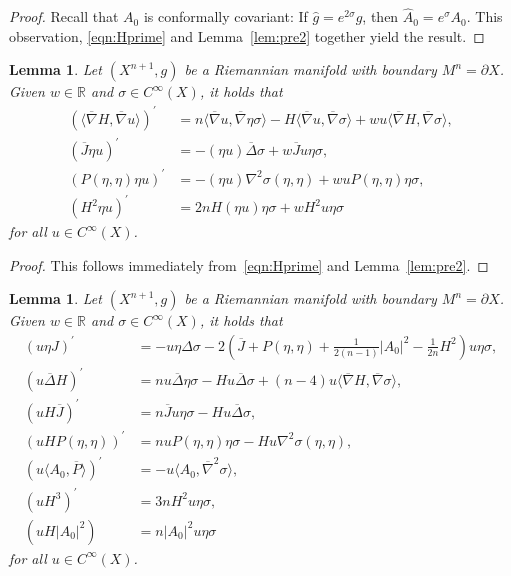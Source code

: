 \documentclass{amsart}
\newtheorem{lem}[thm]{Lemma}
\theoremstyle{definition}
\theoremstyle{remark}
\numberwithin{equation}{section}
\begin{document}
\begin{proof}
 Recall that $A_0$ is conformally covariant: If ${\widehat{g}}=e^{2\sigma}g$, then ${\widehat{A}}_0=e^{\sigma}A_0$.  This observation, \eqref{eqn:Hprime} and Lemma~\ref{lem:pre2} together yield the result.
\end{proof}

\begin{lem}
 \label{lem:pre31}
 Let $(X^{n+1},g)$ be a Riemannian manifold with boundary $M^n=\partial X$.  Given $w\in{\mathbb{R}}$ and $\sigma\in C^\infty(X)$, it holds that
 \begin{align*}
  \left({\langle}{\overline{\nabla}} H,{\overline{\nabla}} u{\rangle}\right)^\prime & = n{\langle}{\overline{\nabla}} u,{\overline{\nabla}}\eta\sigma{\rangle} - H{\langle}{\overline{\nabla}} u,{\overline{\nabla}}\sigma{\rangle} + wu{\langle}{\overline{\nabla}} H,{\overline{\nabla}}\sigma{\rangle}, \\
  \left({\overline{J}}\eta u\right)^\prime & = -(\eta u){\overline{\Delta}}\sigma + w{\overline{J}} u\eta\sigma, \\
  \left(P(\eta,\eta)\eta u\right)^\prime & = -(\eta u)\nabla^2\sigma(\eta,\eta) + wuP(\eta,\eta)\eta\sigma , \\
  \left(H^2\eta u\right)^\prime & = 2nH(\eta u)\eta\sigma + wH^2u\eta\sigma
 \end{align*}
 for all $u\in C^\infty(X)$.
\end{lem}

\begin{proof}
 This follows immediately from~\eqref{eqn:Hprime} and Lemma~\ref{lem:pre2}.
\end{proof}

\begin{lem}
 \label{lem:pre30}
 Let $(X^{n+1},g)$ be a Riemannian manifold with boundary $M^n=\partial X$.  Given $w\in{\mathbb{R}}$ and $\sigma\in C^\infty(X)$, it holds that
 \begin{align*}
  \left(u\eta J\right)^\prime & = -u\eta\Delta\sigma - 2\left({\overline{J}}+P(\eta,\eta) + \frac{1}{2(n-1)}{\lvert} A_0{\rvert}^2 - \frac{1}{2n}H^2\right)u\eta\sigma , \\
  \left(u{\overline{\Delta}} H\right)^\prime & = nu{\overline{\Delta}}\eta\sigma - Hu{\overline{\Delta}}\sigma + (n-4)u{\langle}{\overline{\nabla}} H,{\overline{\nabla}}\sigma{\rangle}, \\
  \left(uH{\overline{J}}\right)^\prime & = n{\overline{J}} u\eta\sigma - Hu{\overline{\Delta}}\sigma, \\
  \left(uHP(\eta,\eta)\right)^\prime & = nuP(\eta,\eta)\eta\sigma - Hu\nabla^2\sigma(\eta,\eta), \\
  \left(u{\langle} A_0,{\overline{P}}{\rangle}\right)^\prime & = -u{\langle} A_0,{\overline{\nabla}}^2\sigma{\rangle}, \\
  \left(uH^3\right)^\prime & = 3nH^2u\eta\sigma , \\
  \left(uH{\lvert} A_0{\rvert}^2\right) & = n{\lvert} A_0{\rvert}^2u\eta\sigma
 \end{align*}
 for all $u\in C^\infty(X)$.
\end{lem}
\end{document}
